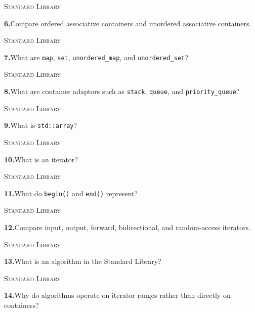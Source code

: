 \documentclass[11pt,a4paper]{article}
\newenvironment{questionblock}{%
  \begin{minipage}[t][0.455\textheight][t]{\textwidth}%
  \raggedright\small
}{%
  \vfill
  \end{minipage}%
}
\newcommand{\sectionlabel}[1]{\textsc{#1}\par\vspace{0.35em}}
\newcommand{\questionnumber}[1]{\textbf{#1.}\enspace}
\begin{document}
\newpage
\begin{questionblock}
\sectionlabel{Standard Library}
\questionnumber{6}Compare ordered associative containers and unordered associative containers.\par
\end{questionblock}
\vspace*{0.04\textheight}
\begin{questionblock}
\sectionlabel{Standard Library}
\questionnumber{7}What are \verb|map|, \verb|set|, \verb|unordered_map|, and \verb|unordered_set|?\par
\end{questionblock}
\newpage
\begin{questionblock}
\sectionlabel{Standard Library}
\questionnumber{8}What are container adaptors such as \verb|stack|, \verb|queue|, and \verb|priority_queue|?\par
\end{questionblock}
\vspace*{0.04\textheight}
\begin{questionblock}
\sectionlabel{Standard Library}
\questionnumber{9}What is \verb|std::array|?\par
\end{questionblock}
\newpage
\begin{questionblock}
\sectionlabel{Standard Library}
\questionnumber{10}What is an iterator?\par
\end{questionblock}
\vspace*{0.04\textheight}
\begin{questionblock}
\sectionlabel{Standard Library}
\questionnumber{11}What do \verb|begin()| and \verb|end()| represent?\par
\end{questionblock}
\newpage
\begin{questionblock}
\sectionlabel{Standard Library}
\questionnumber{12}Compare input, output, forward, bidirectional, and random-access iterators.\par
\end{questionblock}
\vspace*{0.04\textheight}
\begin{questionblock}
\sectionlabel{Standard Library}
\questionnumber{13}What is an algorithm in the Standard Library?\par
\end{questionblock}
\newpage
\begin{questionblock}
\sectionlabel{Standard Library}
\questionnumber{14}Why do algorithms operate on iterator ranges rather than directly on containers?\par
\end{questionblock}
\end{document}
